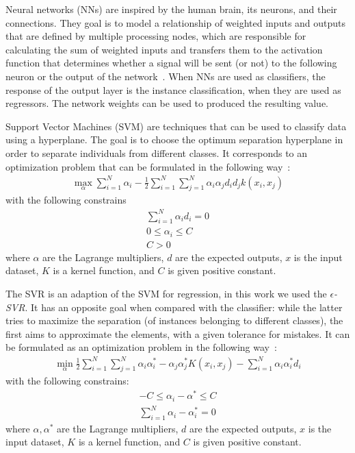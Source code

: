\documentclass{sig-alternate-05-2015}
\begin{document}
Neural networks (NNs) are inspired by the human brain, its neurons, and their connections. They goal is to model a relationship of weighted inputs and outputs that are defined by multiple processing nodes, which are responsible for calculating the sum of weighted inputs and transfers them to the activation function that determines whether a signal will be sent (or not) to the following neuron or the output of the network~\cite{Haykin2007}. When NNs are used as  classifiers, the response of the output layer is the instance classification, when they are used as regressors. The network weights can be used to produced the resulting value.

Support Vector Machines (SVM) are techniques that can be used to classify data using a hyperplane. The goal is to choose the optimum separation hyperplane in order to separate individuals from different classes. It corresponds to an optimization problem that can be formulated in the following way~\cite{Haykin2007}:
\begin{align}
\max_{\alpha} \sum\limits_{i=1}^{N} \alpha_{i} - \frac{1}{2} \sum\limits_{i=1}^{N} \sum\limits_{j=1}^{N} \alpha_{i}\alpha_{j}d_{i}d_{j}k(x_{i},x_{j})
\end{align}
with the following constrains
\begin{align}
\sum\limits_{i=1}^{N} \alpha_{i}d_{i} = 0 \\
0 \leq \alpha_{i} \leq C \\
C > 0
\end{align}
where \(\alpha\) are the Lagrange multipliers, \(d\) are the expected outputs, \(x\) is the input dataset, \(K\) is a kernel function, and \(C\) is given positive constant.

The SVR is an adaption of the SVM for regression, in this work we used the \emph{\(\epsilon\)-SVR}. It has an opposite goal when compared with the classifier: while the latter tries to maximize the separation (of instances belonging to different classes), the first aims to approximate the elements, with a given tolerance for mistakes. It can be  formulated as an optimization problem in the following way~\cite{Haykin2007}:
\begin{align}
\min_{\alpha} \frac{1}{2} \sum\limits_{i=1}^{N} \sum\limits_{j=1}^{N} \alpha_{i}\alpha^{*}_{i} - \alpha_{j}\alpha^{*}_{j} K(x_{i},x_{j}) - \sum\limits_{i=1}^{N} \alpha_{i}\alpha^{*}_{i}d_{i}
\end{align}
with the following constrains:
\begin{align}
-C \leq \alpha_{i} - \alpha^{*} \leq C \\
 \sum\limits_{i=1}^{N} \alpha_{i} - \alpha^{*}_{i} = 0
\end{align}
where \(\alpha, \alpha^{*}\) are the Lagrange multipliers, \(d\) are the expected outputs, \(x\) is the input dataset, \(K\) is a kernel function, and \(C\) is given positive constant.
\end{document}
